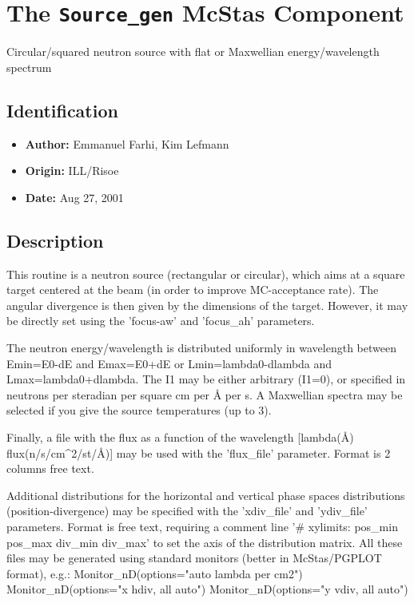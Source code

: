 \section{The \texttt{Source\_gen} McStas Component}
Circular/squared neutron source with flat or Maxwellian energy/wavelength
spectrum

\subsection*{Identification}
\begin{itemize}
  \item \textbf{Author:} Emmanuel Farhi, Kim Lefmann
  \item \textbf{Origin:} ILL/Risoe
  \item \textbf{Date:} Aug 27, 2001
\end{itemize}

\subsection*{Description}
This routine is a neutron source (rectangular or circular), which aims at a square target centered at the beam (in order to improve MC-acceptance rate). The angular divergence is then given by the dimensions of the target. However, it may be directly set using the 'focus-aw' and 'focus\_ah' parameters.

The neutron energy/wavelength is distributed uniformly in wavelength between Emin=E0-dE and Emax=E0+dE or Lmin=lambda0-dlambda and Lmax=lambda0+dlambda. The I1 may be either arbitrary (I1=0), or specified in neutrons per steradian per square cm per \AA{} per s. A Maxwellian spectra may be selected if you give the source temperatures (up to 3).

Finally, a file with the flux as a function of the wavelength [lambda(\AA{}) flux(n/s/cm\textasciicircum{}2/st/\AA{})] may be used with the 'flux\_file' parameter. Format is 2 columns free text.

Additional distributions for the horizontal and vertical phase spaces distributions (position-divergence) may be specified with the 'xdiv\_file' and 'ydiv\_file' parameters. Format is free text, requiring a comment line '\# xylimits: pos\_min pos\_max div\_min div\_max' to set the axis of the distribution matrix. All these files may be generated using standard monitors (better in McStas/PGPLOT format), e.g.: Monitor\_nD(options="auto lambda per cm2") Monitor\_nD(options="x hdiv, all auto") Monitor\_nD(options="y vdiv, all auto")


